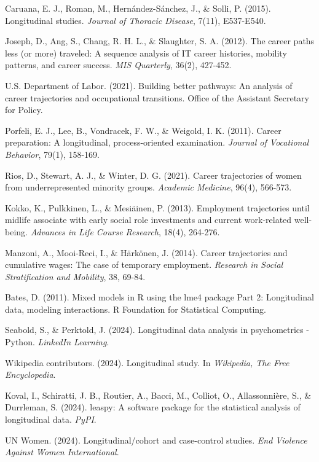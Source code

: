 \documentclass[../main.tex]{subfiles}
\begin{document}
\begin{thebibliography}{99}

Caruana, E. J., Roman, M., Hernández-Sánchez, J., \& Solli, P. (2015). Longitudinal studies. \textit{Journal of Thoracic Disease}, 7(11), E537-E540.

Joseph, D., Ang, S., Chang, R. H. L., \& Slaughter, S. A. (2012). The career paths less (or more) traveled: A sequence analysis of IT career histories, mobility patterns, and career success. \textit{MIS Quarterly}, 36(2), 427-452.

U.S. Department of Labor. (2021). Building better pathways: An analysis of career trajectories and occupational transitions. Office of the Assistant Secretary for Policy.

Porfeli, E. J., Lee, B., Vondracek, F. W., \& Weigold, I. K. (2011). Career preparation: A longitudinal, process-oriented examination. \textit{Journal of Vocational Behavior}, 79(1), 158-169.

Rios, D., Stewart, A. J., \& Winter, D. G. (2021). Career trajectories of women from underrepresented minority groups. \textit{Academic Medicine}, 96(4), 566-573.

Kokko, K., Pulkkinen, L., \& Mesiäinen, P. (2013). Employment trajectories until midlife associate with early social role investments and current work-related well-being. \textit{Advances in Life Course Research}, 18(4), 264-276.

Manzoni, A., Mooi-Reci, I., \& Härkönen, J. (2014). Career trajectories and cumulative wages: The case of temporary employment. \textit{Research in Social Stratification and Mobility}, 38, 69-84.

Bates, D. (2011). Mixed models in R using the lme4 package Part 2: Longitudinal data, modeling interactions. R Foundation for Statistical Computing.

Seabold, S., \& Perktold, J. (2024). Longitudinal data analysis in psychometrics - Python. \textit{LinkedIn Learning}.

Wikipedia contributors. (2024). Longitudinal study. In \textit{Wikipedia, The Free Encyclopedia}.

Koval, I., Schiratti, J. B., Routier, A., Bacci, M., Colliot, O., Allassonnière, S., \& Durrleman, S. (2024). leaspy: A software package for the statistical analysis of longitudinal data. \textit{PyPI}.

UN Women. (2024). Longitudinal/cohort and case-control studies. \textit{End Violence Against Women International}.

\end{thebibliography}
\end{document}
